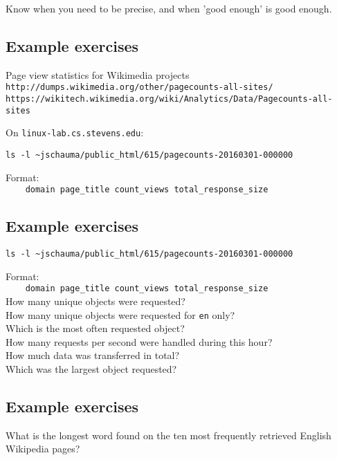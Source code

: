 \documentclass[xga]{xdvislides}
\begin{document}
Know when you need to be precise, and when 'good
enough' is good enough.

\subsection{Example exercises}
Page view statistics for Wikimedia projects \\
{\tt http://dumps.wikimedia.org/other/pagecounts-all-sites/} \\
{\tt https://wikitech.wikimedia.org/wiki/Analytics/Data/Pagecounts-all-sites} \\
\vspace{.5in}

On {\tt linux-lab.cs.stevens.edu}:
\begin{verbatim}
ls -l ~jschauma/public_html/615/pagecounts-20160301-000000
\end{verbatim}
\vspace{.5in}
Format: \\
\verb+    domain page_title count_views total_response_size+

\subsection{Example exercises}
\begin{verbatim}
ls -l ~jschauma/public_html/615/pagecounts-20160301-000000
\end{verbatim}
Format: \\
\verb+    domain page_title count_views total_response_size+
\\

How many unique objects were requested? \\

How many unique objects were requested for {\tt en} only? \\

Which is the most often requested object? \\

How many requests per second were handled during this hour? \\

How much data was transferred in total? \\

Which was the largest object requested?

\subsection{Example exercises}
What is the longest word found on the ten most frequently retrieved
English Wikipedia pages?
\end{document}

